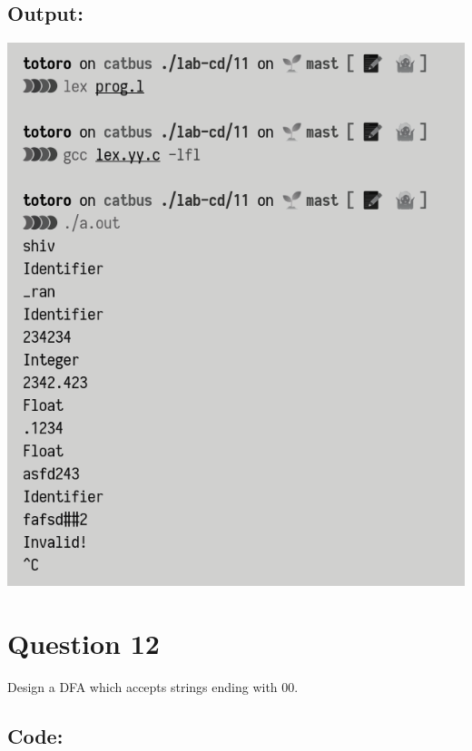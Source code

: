 \documentclass{article}
\begin{document}
\subsection*{Output:}
\begin{center}
  \includegraphics[width=14cm]{11/out.png}
\end{center}

\newpage
\section*{Question 12}
Design a DFA which accepts strings ending with 00.
\subsection*{Code:}

\newpage
\end{document}
